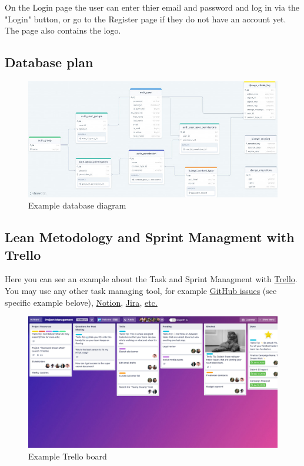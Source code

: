 \documentclass[12pt,a4paper]{article}
\begin{document}
\begin{spacing}{1.5}
    On the Login page the user can enter thier email and password and log in via
    the "Login" button, or go to the Register page if they do not have an account
    yet. The page also contains the logo. \newpage

    \subsection{Database plan}
    \begin{figure}[h]
        \centering
        \includegraphics[width=16cm]{assets/database-diagram-example.jpg}
        \caption{Example database diagram}
        \label{fig:database-diagram}
    \end{figure}
    \FloatBarrier

    \subsection{Lean Metodology and Sprint Managment with Trello}\label{subseq:lean-and-trello}

    Here you can see an example about the Task and Sprint Managment with
    \href{https://trello.com/}{Trello}. You may use any other task managing tool,
    for example \href{https://github.com/features/issues}{GitHub issues} (see
    specific example belove), \href{https://www.notion.so/}{Notion},
    \href{https://www.atlassian.com/software/jira}{Jira},
    \href{https://www.dragapp.com/blog/free-task-management-software/}{etc.}

    \begin{figure}[h]
        \centering
        \includegraphics[width=14cm]{assets/trello-board-example.png}
        \caption{Example Trello board}
        \label{fig:trello-board}
    \end{figure}
    \FloatBarrier


\end{spacing}
\end{document}
